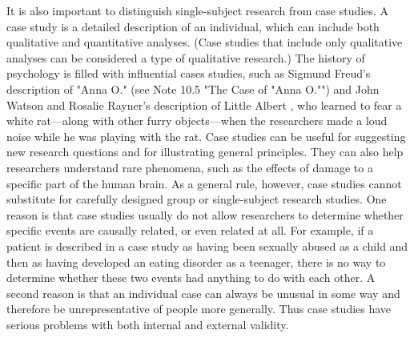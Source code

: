 It is also important to distinguish single-subject research from case studies. A case study is a detailed description of an individual, which can include both qualitative and quantitative analyses. (Case studies that include only qualitative analyses can be considered a type of qualitative research.) The history of psychology is filled with influential cases studies, such as Sigmund Freud's description of "Anna O." (see Note 10.5 "The Case of "Anna O."") and John Watson and Rosalie Rayner's description of Little Albert \citep{watson_conditioned_1920}, who learned to fear a white rat---along with other furry objects---when the researchers made a loud noise while he was playing with the rat. Case studies can be useful for suggesting new research questions and for illustrating general principles. They can also help researchers understand rare phenomena, such as the effects of damage to a specific part of the human brain. As a general rule, however, case studies cannot substitute for carefully designed group or single-subject research studies. One reason is that case studies usually do not allow researchers to determine whether specific events are causally related, or even related at all. For example, if a patient is described in a case study as having been sexually abused as a child and then as having developed an eating disorder as a teenager, there is no way to determine whether these two events had anything to do with each other. A second reason is that an individual case can always be unusual in some way and therefore be unrepresentative of people more generally. Thus case studies have serious problems with both internal and external validity.

